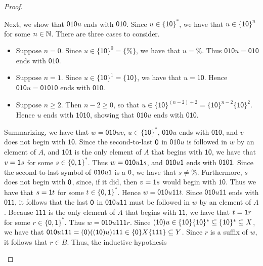\begin{proof}
\begin{itemize}
\begin{itemize}
\begin{itemize}
      Next, we show that $\mathsf{010}u$ ends with $\mathsf{010}$.
      Since $u\in\{\mathsf{10}\}^*$, we have that
      $u\in\{\mathsf{10}\}^n$ for some $n\in\mathbb{N}$.  There are three
      cases to consider.
      \begin{itemize}
      \item Suppose $n=0$.  Since $u\in\{\mathsf{10}\}^0=\{\%\}$, we
        have that $u=\%$.  Thus $\mathsf{010}u=\mathsf{010}$ ends with
        $\mathsf{010}$.
      \item Suppose $n=1$.  Since
        $u\in\{\mathsf{10}\}^1=\{\mathsf{10}\}$, we have that
        $u=\mathsf{10}$.  Hence $\mathsf{010}u= \mathsf{01010}$ ends
        with $\mathsf{010}$.
      \item Suppose $n\geq 2$.  Then $n-2\geq 0$, so that
        $u\in\{\mathsf{10}\}^{(n-2)+2}=\{\mathsf{10}\}^{n-2}\{\mathsf{10}\}^2$.
        Hence $u$ ends with $\mathsf{1010}$, showing that
        $\mathsf{010}u$ ends with $\mathsf{010}$.
      \end{itemize}
      Summarizing, we have that $w=\mathsf{010}uv$,
      $u\in\{\mathsf{10}\}^*$, $\mathsf{010}u$ ends with
      $\mathsf{010}$, and $v$ does not begin with $\mathsf{10}$.
      Since the second-to-last $\mathsf{0}$ in $\mathsf{010}u$ is
      followed in $w$ by an element of $A$, and $\mathsf{101}$ is the
      only element of $A$ that begins with $\mathsf{10}$, we have that
      $v=\mathsf{1} s$ for some $s\in\mathsf{\{0,1\}}^*$.  Thus
      $w=\mathsf{010}u\mathsf{1} s$, and $\mathsf{010}u\mathsf{1}$ ends with
      $\mathsf{0101}$.  Since the second-to-last symbol of
      $\mathsf{010}u\mathsf{1}$ is a $\mathsf{0}$, we have that $s\neq\%$.
      Furthermore, $s$ does not begin with $\mathsf{0}$, since, if it
      did, then $v=\mathsf{1} s$ would begin with $\mathsf{10}$.  Thus we
      have that $s=\mathsf{1} t$ for some $t\in\mathsf{\{0,1\}}^*$.  Hence
      $w=\mathsf{010}u\mathsf{11}t$.  Since $\mathsf{010}u\mathsf{11}$
      ends with $\mathsf{011}$, it follows that the last $\mathsf{0}$ in
      $\mathsf{010}u\mathsf{11}$ must be followed in $w$ by an element
      of $A$.  Because $\mathsf{111}$ is the only element of $A$ that
      begins with $\mathsf{11}$, we have that $t=\mathsf{1} r$ for some
      $r\in \mathsf{\{0,1\}}^*$.  Thus $w=\mathsf{010}u\mathsf{111}r$.
      Since $(\mathsf{10})u\in\{\mathsf{10}\}\{\mathsf{10}\}^*\subseteq
      \{\mathsf{10}\}^*\subseteq X$, we have that
      $\mathsf{010}u\mathsf{111}=(\mathsf{0})((\mathsf{10})u)\mathsf{111}\in
      \{\mathsf{0}\}X\{\mathsf{111}\}\subseteq Y$.  Since $r$ is a suffix of
      $w$, it follows that $r\in B$.  Thus, the inductive hypothesis

\end{itemize}
\end{itemize}
\end{itemize}
\end{proof}
